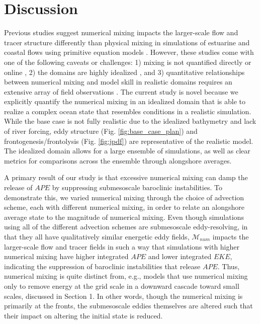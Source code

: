 \documentclass[draft]{agujournal2019}
\begin{document}
\section{Discussion} \label{sec:discussion}

Previous studies suggest numerical mixing impacts the larger-scale flow and tracer structure differently than physical mixing in simulations of estuarine and coastal flows using primitive equation models \cite{fofonova2021plume, Kalra_2019, karna2016evaluation, Ralston_2017}. However, these studies come with one of the following caveats or challenges: 1) mixing is not quantified directly or online \cite{fofonova2021plume, karna2016evaluation}, 2) the domains are highly idealized \cite{fofonova2021plume, Kalra_2019}, and 3) quantitative relationships between numerical mixing and model skill in realistic domains requires an extensive array of field observations \cite{karna2016evaluation, Ralston_2017}. The current study is novel because we explicitly quantify the numerical mixing in an idealized domain that is able to realize a complex ocean state that resembles conditions in a realistic simulation. While the base case is not fully realistic due to the idealized bathymetry and lack of river forcing, eddy structure (Fig. \ref{fig:base_case_plan}) and frontogenesis/frontolysis (Fig. \ref{fig:jpdf}) are representative of the realistic model. The idealized domain allows for a large ensemble of simulations, as well as clear metrics for comparisons across the ensemble through alongshore averages.

A primary result of our study is that excessive numerical mixing can damp the release of $APE$ by suppressing submesoscale baroclinic instabilities. To demonstrate this, we varied numerical mixing through the choice of advection scheme, each with different numerical mixing, in order to relate an alongshore average state to the magnitude of numerical mixing. Even though simulations using all of the different advection schemes are submesoscale eddy-resolving, in that they all have qualitatively similar energetic eddy fields, $\mathcal{M}_{num}$ impacts the larger-scale flow and tracer fields in such a way that simulations with higher numerical mixing have higher integrated $APE$ and lower integrated $EKE$, indicating the suppression of baroclinic instabilities that release $APE$. Thus, numerical mixing is quite distinct from, e.g., models that use numerical mixing only to remove energy at the grid scale in a downward cascade toward small scales, discussed in Section 1. In other words, though the numerical mixing is primarily at the fronts, the submesoscale eddies themselves are altered such that their impact on altering the initial state is reduced.
\end{document}
